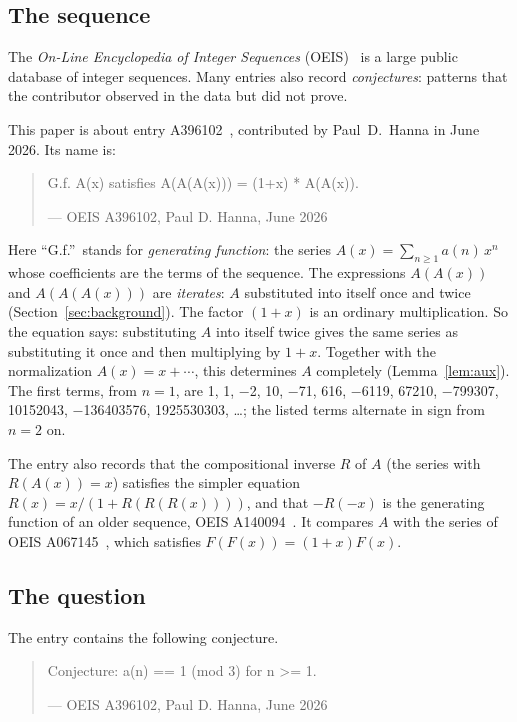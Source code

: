 \documentclass[11pt,a4paper]{article}
\theoremstyle{definition}
\theoremstyle{remark}
\begin{document}
\subsection{The sequence}\label{sec:sequence}
The \emph{On-Line Encyclopedia of Integer Sequences} (OEIS)~\cite{oeisdb} is a large public database of integer
sequences. Many
entries also record \emph{conjectures}: patterns that the contributor observed in the data but did not prove.

This paper is about entry A396102~\cite{oeis}, contributed by Paul~D.~Hanna in June 2026. Its name is:
\begin{quote}\small\ttfamily\raggedright G.f. A(x) satisfies A(A(A(x))) = (1+x) * A(A(x)).\par\smallskip\hfill\textrm{--- OEIS A396102, Paul D. Hanna, June 2026}\end{quote}

Here ``G.f.''\ stands for \emph{generating function}: the series $A(x)=\sum_{n\ge1}a(n)\,x^n$ whose coefficients are
the terms of the sequence. The expressions $A(A(x))$ and $A(A(A(x)))$ are \emph{iterates}: $A$ substituted into itself
once and twice (Section~\ref{sec:background}). The factor $(1+x)$ is an ordinary multiplication. So the equation says:
substituting $A$ into itself twice gives the same series as substituting it once and then multiplying by $1+x$.
Together with the normalization $A(x)=x+\cdots$, this determines $A$ completely (Lemma~\ref{lem:aux}). The first
terms, from $n=1$, are 1, 1, $-$2, 10, $-$71, 616, $-$6119, 67210, $-$799307, 10152043, $-$136403576, 1925530303, \dots{}; the listed terms alternate in sign from $n=2$ on.

The entry also records that the compositional inverse $R$ of $A$ (the series with $R(A(x))=x$) satisfies the simpler
equation $R(x)=x/(1+R(R(R(x))))$, and that $-R(-x)$ is the generating function of an older sequence, OEIS
A140094~\cite{oeisR}. It compares $A$ with the series of OEIS A067145~\cite{oeisF2}, which satisfies $F(F(x))=(1+x)F(x)$.

\subsection{The question}
The entry contains the following conjecture.
\begin{quote}\small\ttfamily\raggedright Conjecture: a(n) == 1 (mod 3) for n >= 1.\par\smallskip\hfill\textrm{--- OEIS A396102, Paul D. Hanna, June 2026}\end{quote}
\end{document}
